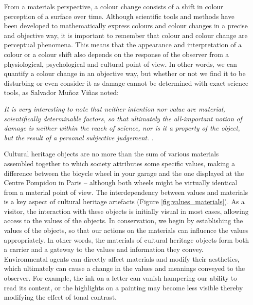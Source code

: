 From a materials perspective, a colour change consists of a shift in colour perception of a surface over time. Although scientific tools and methods have been developed to mathematically express colours and colour changes in a precise and objective way, it is important to remember that colour and colour change are perceptual phenomena. This means that the appearance and interpretation of a colour or a colour shift also depends on the response of the observer from a physiological, psychological and cultural point of view. In other words, we can quantify a colour change in an objective way, but whether or not we find it to be disturbing or even consider it as damage  cannot be determined with exact science tools, as Salvador Mu\~noz Vi\~nas noted: 

\textit{It is very interesting to note that neither intention nor value are material, scientifically determinable factors, so that ultimately the all-important notion of damage is neither within the reach of science, nor is it a property of the object, but the result of a personal subjective judgement.} \citep[102]{munoz_vinas_contemporary_2005}. \\




Cultural heritage objects are no more than the sum of various materials assembled together to which society attributes some specific values, making a difference between the bicycle wheel in your garage and the one displayed at the Centre Pompidou in Paris – although both wheels might be virtually identical from a material point of view. The interdependency between values and materials is a key aspect of cultural heritage artefacts (Figure \ref{fig:values_materials}). As a visitor, the interaction with these objects is initially visual in most cases, allowing access to the values of the objects. In conservation, we begin by establishing the values of the objects, so that our actions on the materials can influence the values appropriately. In other words, the materials of cultural heritage objects form both a carrier and a gateway to the values and information they convey. Environmental agents can directly affect materials and modify their aesthetics, which ultimately can cause a change in the values and meanings conveyed to the observer. For example, the ink on a letter can vanish hampering our ability to read its content, or the highlights on a painting may become less visible thereby modifying the effect of tonal contrast.\\


